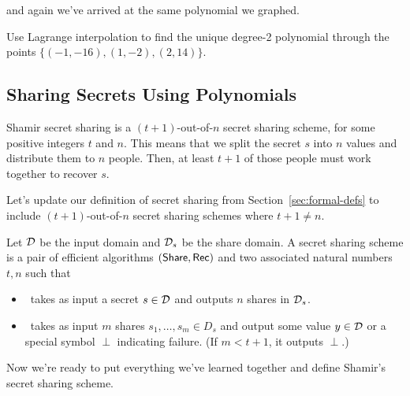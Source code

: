 \begin{example}
and again we've arrived at the same polynomial we graphed.
\end{example}

\begin{bonus}
    Use Lagrange interpolation to find the unique degree-2 
    polynomial through the points $\{(-1,-16),(1,-2),(2,14)\}$.
\end{bonus}

\subsection{Sharing Secrets Using Polynomials}

Shamir secret sharing is a $(t+1)$-out-of-$n$ secret sharing scheme, for some positive integers $t$ and $n$. This means that we split the secret $s$ into $n$ values and distribute them to $n$ people. Then, at least $t+1$ of those people must work together to recover $s$.

Let's update our definition of secret sharing from Section~\ref{sec:formal-defs}
to include $(t+1)$-out-of-$n$ secret sharing schemes where $t+1 \neq n$.

\begin{definition}\label{def:ss-update}
    Let $\mathcal{D}$ be the input domain and $\mathcal{D}_s$ be the share domain.
    A secret sharing scheme is a pair of efficient algorithms $(\mathsf{Share}, \mathsf{Rec})$
    and two associated natural numbers $t,n$ such that

    \begin{itemize}
        \item \share~takes as input a secret $s \in \mathcal{D}$ and outputs $n$ 
        shares in $\mathcal{D}_s$.
        \item \rec~takes as input $m$ shares $s_1, \ldots, s_m \in D_s$ 
        and output some value $y \in \mathcal{D}$ or a special symbol $\perp$ 
        indicating failure. (If $m < t+1$, it outputs $\perp$.)
    \end{itemize}
\end{definition}

Now we're ready to put everything we've learned together and define 
Shamir's secret sharing scheme\footnotemark.


